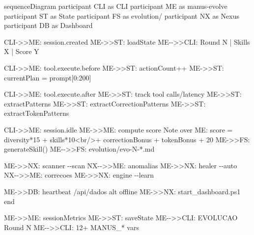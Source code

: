 \documentclass[
  12pt,
]{article}
\newenvironment{Shaded}{}{}
\newcommand{\NormalTok}[1]{#1}
\begin{document}
\begin{Shaded}
\begin{Highlighting}[]
\NormalTok{sequenceDiagram}
\NormalTok{participant CLI as CLI}
\NormalTok{participant ME as manus{-}evolve}
\NormalTok{participant ST as State}
\NormalTok{participant FS as evolution/}
\NormalTok{participant NX as Nexus}
\NormalTok{participant DB as Dashboard}

\NormalTok{CLI{-}\textgreater{}\textgreater{}ME: session.created}
\NormalTok{ME{-}\textgreater{}\textgreater{}ST: loadState}
\NormalTok{ME{-}{-}\textgreater{}\textgreater{}CLI: Round N | Skills X | Score Y}

\NormalTok{CLI{-}\textgreater{}\textgreater{}ME: tool.execute.before}
\NormalTok{ME{-}\textgreater{}\textgreater{}ST: actionCount++}
\NormalTok{ME{-}\textgreater{}\textgreater{}ST: currentPlan = prompt[0:200]}

\NormalTok{CLI{-}\textgreater{}\textgreater{}ME: tool.execute.after}
\NormalTok{ME{-}\textgreater{}\textgreater{}ST: track tool calls/latency}
\NormalTok{ME{-}\textgreater{}\textgreater{}ST: extractPatterns}
\NormalTok{ME{-}\textgreater{}\textgreater{}ST: extractCorrectionPatterns}
\NormalTok{ME{-}\textgreater{}\textgreater{}ST: extractTokenPatterns}

\NormalTok{CLI{-}\textgreater{}\textgreater{}ME: session.idle}
\NormalTok{ME{-}\textgreater{}\textgreater{}ME: compute score}
\NormalTok{Note over ME: score = diversity*15 + skills*10\textless{}br/\textgreater{}+ correctionBonus + tokenBonus + 20}
\NormalTok{ME{-}\textgreater{}\textgreater{}FS: generateSkill()}
\NormalTok{ME{-}{-}\textgreater{}\textgreater{}FS: evolution/evo{-}N{-}*.md}

\NormalTok{ME{-}\textgreater{}\textgreater{}NX: scanner {-}{-}scan}
\NormalTok{NX{-}{-}\textgreater{}\textgreater{}ME: anomalias}
\NormalTok{ME{-}\textgreater{}\textgreater{}NX: healer {-}{-}auto}
\NormalTok{NX{-}{-}\textgreater{}\textgreater{}ME: correcoes}
\NormalTok{ME{-}\textgreater{}\textgreater{}NX: engine {-}{-}learn}

\NormalTok{ME{-}\textgreater{}\textgreater{}DB: heartbeat /api/dados}
\NormalTok{alt offline}
\NormalTok{    ME{-}\textgreater{}\textgreater{}NX: start\_dashboard.ps1}
\NormalTok{end}

\NormalTok{ME{-}\textgreater{}\textgreater{}ME: sessionMetrics}
\NormalTok{ME{-}\textgreater{}\textgreater{}ST: saveState}
\NormalTok{ME{-}{-}\textgreater{}\textgreater{}CLI: EVOLUCAO Round N}
\NormalTok{ME{-}{-}\textgreater{}\textgreater{}CLI: 12+ MANUS\_* vars}
\end{Highlighting}
\end{Shaded}
\end{document}
